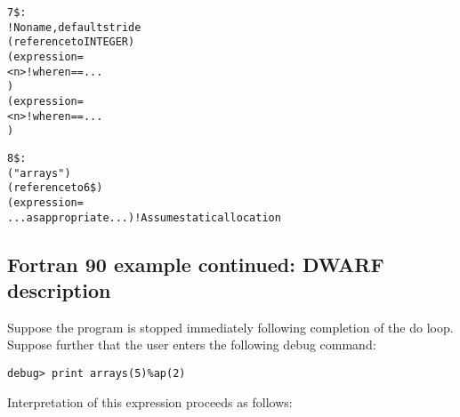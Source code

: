 \begin{alltt}
7\$: 
        ! No name, default stride
        (reference to INTEGER)
        (expression=
            <n> ! where n == ...
            )
        (expression=
            <n> ! where n == ...
            )

8\$: 
        ("arrays")
        (reference to 6\$)
        (expression=
            ...as appropriate...) ! Assume static allocation
\end{alltt}

\subsection{Fortran 90 example continued: DWARF description}
\label{app:fortran90examplecontinueddwarfdescription}

Suppose the program is stopped immediately following completion
of the do loop. Suppose further that the user enters the
following debug command:

\begin{lstlisting}
debug> print arrays(5)%ap(2)
\end{lstlisting}

Interpretation of this expression proceeds as follows:

